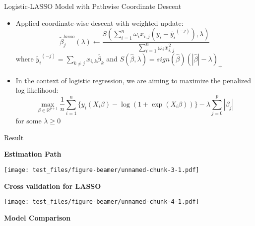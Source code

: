 \documentclass[ignorenonframetext,]{beamer}
\begin{document}
\begin{frame}{Logistic-LASSO Model with Pathwise Coordinate Descent}

\begin{itemize}
\item
  Applied coordinate-wise descent with weighted update: \[
  \tilde{\beta}^{lasso}_{j}(\lambda) \leftarrow \frac{S(\sum_{i=1}^{n}\omega_{i}x_{i,j}(y_{i} - \tilde{y_{i}}^{(-j)}), \lambda)}{\sum_{i=1}^n\omega_{i}x_{i,j}^{2}}
  \] where
  \(\tilde{y_{i}}^{(-j)} = \sum_{k \neq j}x_{i,k}\tilde{\beta_{k}}\) and
  \(S(\hat{\beta}, \lambda) = sign(\hat{\beta})(|\hat{\beta}| - \lambda)_{+}\)
\item
  In the context of logistic regression, we are aiming to maximize the
  penalized log likelihood:
  \[\max_{\beta \in \mathbb{R}^{p+1}} \frac{1}{n}\sum_{i=1}^n  \{y_i(X_{i}\beta)-\log(1+\exp(X_{i}\beta))\}-\lambda \sum_{j=0}^p |\beta_j|\]
  for some \(\lambda \geq 0\)
\end{itemize}

\end{frame}

\begin{frame}{Result}

\textbf{Estimation Path}

\texttt{[image: test\_files/figure-beamer/unnamed-chunk-3-1.pdf]}

\end{frame}

\begin{frame}{}

\textbf{Cross validation for LASSO}

\texttt{[image: test\_files/figure-beamer/unnamed-chunk-4-1.pdf]}

\end{frame}

\begin{frame}{}

\textbf{Model Comparison}

\begin{table}[!h]

\caption{\label{tab:unnamed-chunk-5}The comparison of performance for estimation algorithms and models}
\centering
{}
\end{table}

\end{frame}
\end{document}
